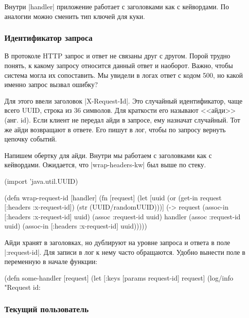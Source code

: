 Внутри \spverb|handler| приложение работает с заголовками как с кейвордами. По
аналогии можно сменить тип ключей для куки.

\subsubsection*{Идентификатор запроса}

В протоколе HTTP запрос и ответ не связаны друг с другом. Порой трудно понять, к
какому запросу относится данный ответ и наоборот. Важно, чтобы система могла их
сопоставить. Мы увидели в логах ответ с кодом 500, но какой именно запрос вызвал
ошибку?

Для этого ввели заголовок \spverb|X-Request-Id|. Это случайный идентификатор,
чаще всего UUID, строка из 36 символов. Для краткости его называют <<айди>>
(анг. id). Если клиент не передал айди в запросе, ему назначат случайный. Тот же
айди возвращают в ответе. Его пишут в лог, чтобы по запросу вернуть цепочку
событий.

Напишем обертку для айди. Внутри мы работаем с заголовками как с
кейвордами. Ожидается, что \spverb|wrap-headers-kw| был выше по стеку.

\begin{english}
  \begin{clojure}
(import 'java.util.UUID)

(defn wrap-request-id [handler]
  (fn [request]
    (let [uuid (or (get-in request [:headers :x-request-id])
                   (str (UUID/randomUUID)))]
      (-> request
          (assoc-in [:headers :x-request-id] uuid)
          (assoc :request-id uuid)
          handler
          (assoc :request-id uuid)
          (assoc-in [:headers :x-request-id] uuid)))))
  \end{clojure}
\end{english}

Айди хранят в заголовках, но дублируют на уровне запроса и ответа в поле
\spverb|:request-id|. Для записи в лог к нему часто обращаются. Удобно вынести
поле в переменную в начале функции:

\begin{english}
  \begin{clojure}
(defn some-handler [request]
  (let [{:keys [params request-id]} request]
    (log/info "Request id: %
  \end{clojure}
\end{english}

\subsubsection*{Текущий пользователь}

